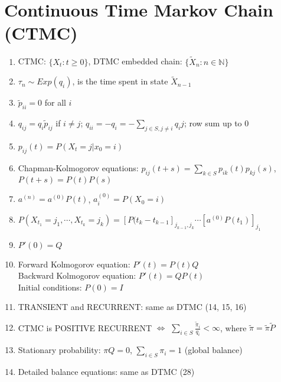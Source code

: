\documentclass[11pt,a4paper]{article}
\begin{document}
\section*{Continuous Time Markov Chain (CTMC)}

\begin{enumerate}[resume]
\item CTMC: $\{ X_t : t \geq 0 \}$, DTMC embedded chain: $\{ \tilde{X}_n : n \in \mathbb{N} \}$

\item $\tau_n \sim Exp(q_i)$, is the time spent in state $\tilde{X}_{n-1}$

\item $\tilde{p}_{ii} = 0$ for all $i$

\item $q_{ij} = q_i \tilde{p}_{ij}$ if $i \neq j$; $q_{ii} = -q_i = - \sum_{j \in S, j \neq i} q_ij$; row sum up to 0

\item $p_{ij} (t) = P(X_t = j | x_0 = i)$

\item Chapman-Kolmogorov equations: $p_{ij} (t+s) = \displaystyle \sum_{k \in S} p_{ik}(t) p_{kj}(s)$, $P(t+s) = P(t) P(s)$

\item $a^{(n)} = a^{(0)} P(t)$, $a_i^{(0)} = P(X_0 = i)$

\item $P(X_{t_1} = j_1, \cdots, X_{t_k} = j_k) = [P(t_k - t_{k-1}]_{j_{k-1},j_k} \cdots [a^{(0)} P(t_1)]_{j_1}$

\item $P'(0) = Q$

\item Forward Kolmogorov equation: $P'(t) = P(t) Q$ \\
Backward Kolmogorov equation: $P'(t) = QP(t)$ \\
Initial conditions: $P(0) = I$

\item TRANSIENT and RECURRENT: same as DTMC (14, 15, 16)

\item CTMC is POSITIVE RECURRENT $\Leftrightarrow$ $\sum_{i \in S} \frac{\tilde{\pi}_i}{q_i} < \infty$, where $\tilde{\pi} = \tilde{\pi} \tilde{P}$

\item Stationary probability: $\pi Q = 0$, $\sum_{i \in S} \pi_i =1$ (global balance)

\item Detailed balance equations: same as DTMC (28)


\end{enumerate}
\end{document}

